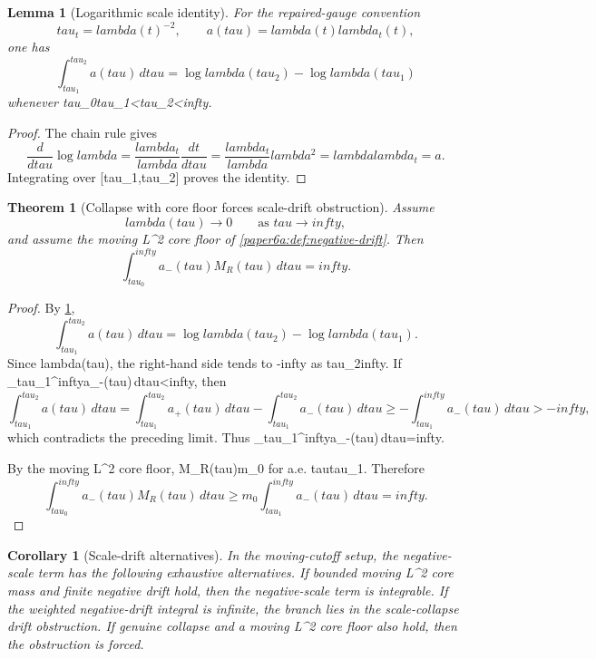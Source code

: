 \documentclass[11pt]{amsart}
\def\({}%
\def\){}%
\def\tau{tau}%
\def\lambda{lambda}%
\def\infty{infty}%
\theoremstyle{plain}
\newtheorem{theorem}{Theorem}[section]
\newtheorem{lemma}[lemma]{Lemma}
\newtheorem{corollary}[corollary]{Corollary}
\theoremstyle{definition}
\theoremstyle{remark}
\begin{document}
\begin{lemma}[Logarithmic scale identity]\label{paper6a:lem:log-scale}
For the repaired-gauge convention
\[
  \tau_t=\lambda(t)^{-2},\qquad a(\tau)=\lambda(t)\lambda_t(t),
\]
one has
\[
  \int_{\tau_1}^{\tau_2}a(\tau)\,d\tau
  =
  \log\lambda(\tau_2)-\log\lambda(\tau_1)
\]
whenever \(\tau_0\le\tau_1<\tau_2<\infty\).
\end{lemma}

\begin{proof}
The chain rule gives
\[
  \frac{d}{d\tau}\log\lambda
  =
  \frac{\lambda_t}{\lambda}\frac{dt}{d\tau}
  =
  \frac{\lambda_t}{\lambda}\lambda^2
  =
  \lambda\lambda_t=a.
\]
Integrating over \([\tau_1,\tau_2]\) proves the identity.
\end{proof}

\begin{theorem}[Collapse with core floor forces scale-drift obstruction]
\label{paper6a:thm:collapse-core-floor}
Assume
\[
  \lambda(\tau)\to0\qquad\text{as }\tau\to\infty,
\]
and assume the moving \(L^2\) core floor of
\cref{paper6a:def:negative-drift}.  Then
\[
  \int_{\tau_0}^{\infty}a_-(\tau)M_R(\tau)\,d\tau=\infty .
\]
\end{theorem}

\begin{proof}
By \cref{paper6a:lem:log-scale},
\[
  \int_{\tau_1}^{\tau_2}a(\tau)\,d\tau
  =
  \log\lambda(\tau_2)-\log\lambda(\tau_1).
\]
Since \(\lambda(\tau)\), the right-hand side tends to \(-\infty\) as
\(\tau_2\to\infty\).  If
\(\int_{\tau_1}^{\infty}a_-(\tau)\,d\tau<\infty\), then
\[
  \int_{\tau_1}^{\tau_2}a(\tau)\,d\tau
  =
  \int_{\tau_1}^{\tau_2}a_+(\tau)\,d\tau
  -
  \int_{\tau_1}^{\tau_2}a_-(\tau)\,d\tau
  \ge
  -\int_{\tau_1}^{\infty}a_-(\tau)\,d\tau>-\infty,
\]
which contradicts the preceding limit.  Thus
\(\int_{\tau_1}^{\infty}a_-(\tau)\,d\tau=\infty\).

By the moving \(L^2\) core floor, \(M_R(\tau)\ge m_0\) for a.e.
\(\tau\ge\tau_1\).  Therefore
\[
  \int_{\tau_0}^{\infty}a_-(\tau)M_R(\tau)\,d\tau
  \ge
  m_0\int_{\tau_1}^{\infty}a_-(\tau)\,d\tau
  =
  \infty.
\]
\end{proof}

\begin{corollary}[Scale-drift alternatives]\label{paper6a:cor:scale-drift-alternatives}
In the moving-cutoff setup, the negative-scale term has the following
exhaustive alternatives.  If bounded moving \(L^2\) core mass and finite negative
drift hold, then the negative-scale term is integrable.  If the weighted
negative-drift integral is infinite, the branch lies in the scale-collapse
drift obstruction.  If genuine collapse and a moving \(L^2\) core floor also
hold, then the obstruction is forced.
\end{corollary}
\end{document}
